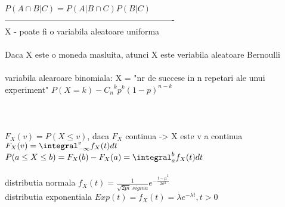 $P(A \cap B | C) = P(A|B \cap C)P(B|C)$\\

-------------------------------------------------------------\\
X - poate fi o variabila aleatoare uniforma\\\\
Daca X este o moneda masluita, atunci X este veriabila aleatoare Bernoulli\\\\
variabila alearoare binomiala: X = "nr de succese in n repetari ale unui experiment"
$P(X=k) - {C_n}^k p^k (1-p)^{n-k}$\\\\

\section{}
$F_X(v) = P(X \le v)$, daca $F_X$ continua -> X este v a continua\\
$F_X(v) = \integral_{-\infty}^v f_X(t) dt$\\
$P(a \le X \le b) = F_X(b) - F_X(a) = \integral_{a}^b f_X(t) dt$\\\\
distributia normala $f_X(t) = \frac{1}{\sqrt{2 pi} \ sigma} e^{-\frac{{t-\mu}^2}{2 \sigma^2}}$\\
distributia exponentiala $Exp(t) = f_X(t) = \lambda e^{-\lambda t}, t \gt 0$\\
